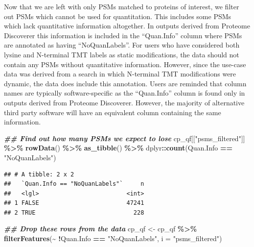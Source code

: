 \documentclass[9pt,a4paper,]{extarticle}
\newenvironment{Shaded}{\begin{snugshade}}{\end{snugshade}}
\newcommand{\AttributeTok}[1]{\textcolor[rgb]{0.13,0.29,0.53}{#1}}
\newcommand{\DocumentationTok}[1]{\textcolor[rgb]{0.56,0.35,0.01}{\textbf{\textit{#1}}}}
\newcommand{\FunctionTok}[1]{\textcolor[rgb]{0.13,0.29,0.53}{\textbf{#1}}}
\newcommand{\NormalTok}[1]{#1}
\newcommand{\OtherTok}[1]{\textcolor[rgb]{0.56,0.35,0.01}{#1}}
\newcommand{\SpecialCharTok}[1]{\textcolor[rgb]{0.81,0.36,0.00}{\textbf{#1}}}
\newcommand{\StringTok}[1]{\textcolor[rgb]{0.31,0.60,0.02}{#1}}
\begin{document}
Now that we are left with only PSMs matched to proteins of interest, we filter
out PSMs which cannot be used for quantitation. This includes some PSMs which
lack quantitative information altogether. In outputs derived from Proteome
Discoverer this information is included in the ``Quan.Info'' column where PSMs are
annotated as having ``NoQuanLabels''. For users who have considered both lysine and
N-terminal TMT labels as static modifications, the data should not contain any
PSMs without quantitative information. However, since the use-case data was
derived from a search in which N-terminal TMT modifications were dynamic, the
data does include this annotation. Users are reminded that column names are
typically software-specific as the ``Quan.Info'' column is found only in outputs
derived from Proteome Discoverer. However, the majority of alternative third
party software will have an equivalent column containing the same information.

\begin{Shaded}
\begin{Highlighting}[]
\DocumentationTok{\#\# Find out how many PSMs we expect to lose}
\NormalTok{cp\_qf[[}\StringTok{"psms\_filtered"}\NormalTok{]] }\SpecialCharTok{\%\textgreater{}\%} 
  \FunctionTok{rowData}\NormalTok{() }\SpecialCharTok{\%\textgreater{}\%} 
  \FunctionTok{as\_tibble}\NormalTok{() }\SpecialCharTok{\%\textgreater{}\%} 
\NormalTok{  dplyr}\SpecialCharTok{::}\FunctionTok{count}\NormalTok{(Quan.Info }\SpecialCharTok{==} \StringTok{"NoQuanLabels"}\NormalTok{)}
\end{Highlighting}
\end{Shaded}

\begin{verbatim}
## # A tibble: 2 x 2
##   `Quan.Info == "NoQuanLabels"`     n
##   <lgl>                         <int>
## 1 FALSE                         47241
## 2 TRUE                            228
\end{verbatim}

\begin{Shaded}
\begin{Highlighting}[]
\DocumentationTok{\#\# Drop these rows from the data}
\NormalTok{cp\_qf }\OtherTok{\textless{}{-}}\NormalTok{ cp\_qf }\SpecialCharTok{\%\textgreater{}\%}
  \FunctionTok{filterFeatures}\NormalTok{(}\SpecialCharTok{\textasciitilde{}} \SpecialCharTok{!}\NormalTok{Quan.Info }\SpecialCharTok{==} \StringTok{"NoQuanLabels"}\NormalTok{, }
                 \AttributeTok{i =} \StringTok{"psms\_filtered"}\NormalTok{)}
\end{Highlighting}
\end{Shaded}
\end{document}
